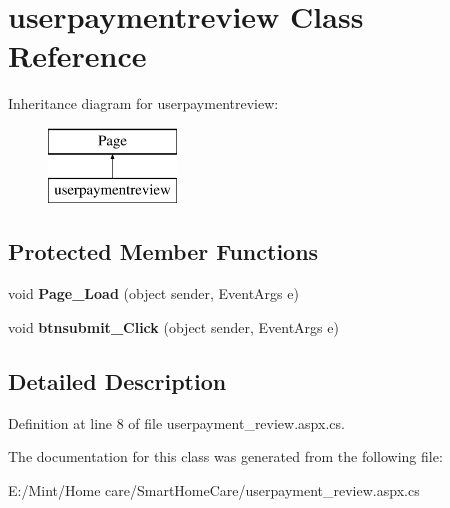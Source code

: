 \hypertarget{classuserpaymentreview}{\section{userpaymentreview Class Reference}
\label{classuserpaymentreview}
}
Inheritance diagram for userpaymentreview\-:\begin{figure}[H]
\begin{center}
\leavevmode
\includegraphics[height=2.000000cm]{classuserpaymentreview}
\end{center}
\end{figure}
\subsection*{Protected Member Functions}
\begin{DoxyCompactItemize}
\item 
\hypertarget{classuserpaymentreview_a3fa1f1f4cbf4ceb3494b0906d5aac025}{void {\bfseries Page\-\_\-\-Load} (object sender, Event\-Args e)}\label{classuserpaymentreview_a3fa1f1f4cbf4ceb3494b0906d5aac025}

\item 
\hypertarget{classuserpaymentreview_aa27f759e0079382395155e6b3d2e090a}{void {\bfseries btnsubmit\-\_\-\-Click} (object sender, Event\-Args e)}\label{classuserpaymentreview_aa27f759e0079382395155e6b3d2e090a}

\end{DoxyCompactItemize}


\subsection{Detailed Description}


Definition at line 8 of file userpayment\-\_\-review.\-aspx.\-cs.



The documentation for this class was generated from the following file\-:\begin{DoxyCompactItemize}
\item 
E\-:/\-Mint/\-Home care/\-Smart\-Home\-Care/userpayment\-\_\-review.\-aspx.\-cs\end{DoxyCompactItemize}
